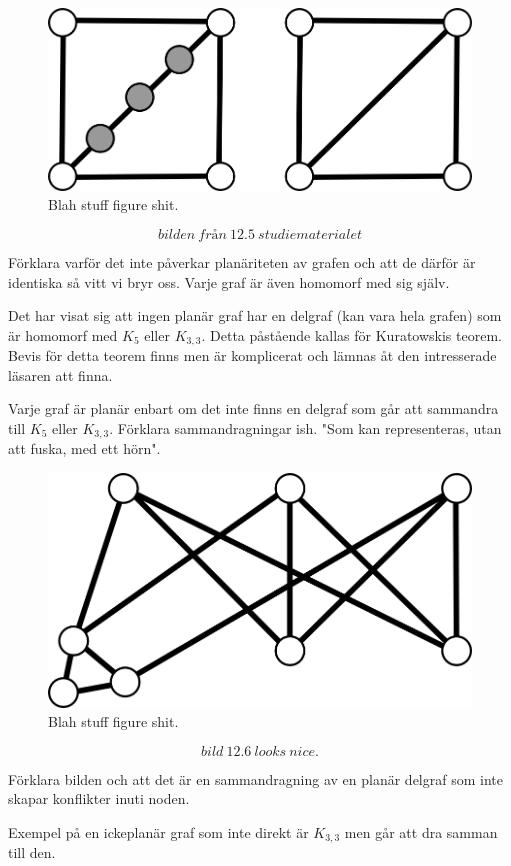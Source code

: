 \documentclass[a4paper,11pt]{article}
\begin{document}
\begin{figure}[!ht]
	\begin{center}
		\includegraphics{fig8}
		\caption{Blah stuff figure shit.}
		\label{fig8}
	\end{center}
\end{figure}
\FloatBarrier

$$bilden\ från\ 12.5\ studiematerialet$$

Förklara varför det inte påverkar planäriteten av grafen och att de därför är identiska så vitt vi bryr oss. Varje graf är även homomorf med sig själv.

Det har visat sig att ingen planär graf har en delgraf (kan vara hela grafen) som är homomorf med $K_{5}$ eller $K_{3,3}$. Detta påstående kallas för Kuratowskis teorem. Bevis för detta teorem finns men är komplicerat och lämnas åt den intresserade läsaren att finna.

Varje graf är planär enbart om det inte finns en delgraf som går att sammandra till $K_5$ eller $K_{3,3}$. Förklara sammandragningar ish. "Som kan representeras, utan att fuska\texttrademark, med ett hörn".

\begin{figure}[!ht]
	\begin{center}
		\includegraphics{fig9}
		\caption{Blah stuff figure shit.}
		\label{fig9}
	\end{center}
\end{figure}
\FloatBarrier

$$bild\ 12.6\ looks\ nice.$$

Förklara bilden och att det är en sammandragning av en planär delgraf som inte skapar konflikter inuti noden.

Exempel på en ickeplanär graf som inte direkt är $K_{3,3}$ men går att dra samman till den.
\end{document}

